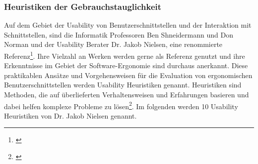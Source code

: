 
\subsubsection{Heuristiken der Gebrauchstauglichkeit}
\label{sec:heuristikenDerGebrauchstauglichkeit}
Auf dem Gebiet der Usability von Benutzerschnittstellen und der Interaktion mit Schnittstellen, sind die Informatik Professoren Ben Shneidermann und Don Norman und der Usability Berater Dr. Jakob Nielsen, eine renommierte Referenz\footnote{\cite[vgl.][]{Wong2018}}. Ihre Vielzahl an Werken werden gerne als Referenz genutzt und ihre Erkenntnisse im Gebiet der Software-Ergonomie sind durchaus anerkannt. Diese praktikablen Ansätze und Vorgehensweisen für die Evaluation von ergonomischen Benutzerschnittstellen werden Usability Heuristiken genannt. Heuristiken sind Methoden, die auf überlieferten Verhaltensweisen und Erfahrungen basieren und dabei helfen komplexe Probleme zu lösen\footnote{\cite[vgl.][]{Heuristik2018}}. Im folgenden werden 10 Usability Heuristiken von Dr. Jakob Nielsen genannt.
